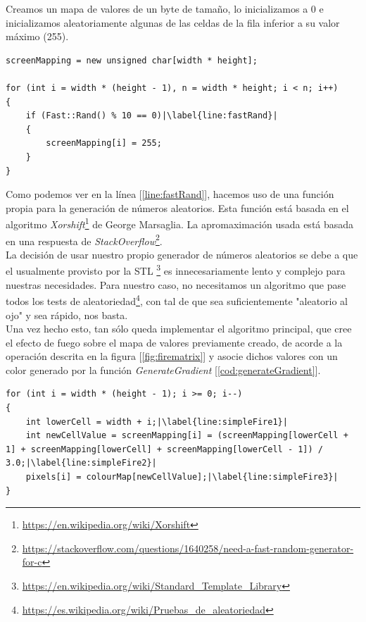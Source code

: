Creamos un mapa de valores de un byte de tamaño, lo inicializamos a 0 e inicializamos aleatoriamente algunas de las celdas de la fila inferior a su valor máximo (255).\\

\begin{lstlisting}[style=C-color, caption={Creación e incialización del mapa de valores},label=cod:screenMapping,escapechar=|]
screenMapping = new unsigned char[width * height];

for (int i = width * (height - 1), n = width * height; i < n; i++)
{
    if (Fast::Rand() % 10 == 0)|\label{line:fastRand}|
    {
        screenMapping[i] = 255;
    }
}
\end{lstlisting}

Como podemos ver en la línea [\ref{line:fastRand}], hacemos uso de una función propia para la generación de números aleatorios. Esta función está basada en el algoritmo \emph{Xorshift}\footnote{\url{https://en.wikipedia.org/wiki/Xorshift}} de George Marsaglia. La apromaximación usada está basada en una respuesta de \emph{StackOverflow}\footnote{\url{https://stackoverflow.com/questions/1640258/need-a-fast-random-generator-for-c}}.\\

La decisión de usar nuestro propio generador de números aleatorios se debe a que el usualmente provisto por la STL \footnote{\url{https://en.wikipedia.org/wiki/Standard_Template_Library}} es innecesariamente lento y complejo para nuestras necesidades. Para nuestro caso, no necesitamos un algoritmo que pase todos los tests de aleatoriedad\footnote{\url{https://es.wikipedia.org/wiki/Pruebas_de_aleatoriedad}}, con tal de que sea suficientemente "aleatorio al ojo" y sea rápido, nos basta.\\

Una vez hecho esto, tan sólo queda implementar el algoritmo principal, que cree el efecto de fuego sobre el mapa de valores previamente creado, de acorde a la operación descrita en la figura [\ref{fig:firematrix}] y asocie dichos valores con un color generado por la función \emph{GenerateGradient} [\ref{cod:generateGradient}].\\

\begin{lstlisting}[style=C-color, caption={Algoritmo básico de efecto de fuego},label=cod:simpleFire,escapechar=|]
for (int i = width * (height - 1); i >= 0; i--)
{
    int lowerCell = width + i;|\label{line:simpleFire1}|
    int newCellValue = screenMapping[i] = (screenMapping[lowerCell + 1] + screenMapping[lowerCell] + screenMapping[lowerCell - 1]) / 3.0;|\label{line:simpleFire2}|
    pixels[i] = colourMap[newCellValue];|\label{line:simpleFire3}|
}
\end{lstlisting}

